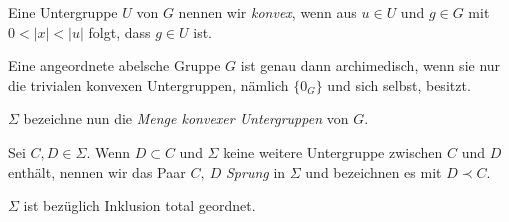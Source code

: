 \begin{defn}\label{konvexUGR} %
Eine Untergruppe $U$ von $G$ nennen wir \textit{konvex}, wenn aus $u \in U$ und $g \in G$ mit $0 < |x| < |u|$ folgt, dass $g \in U$ ist.\\
\end{defn}
%
%
%
%
%
\begin{satz}\label{archimedischNur TrivialeUGR}
Eine angeordnete abelsche Gruppe $G$ ist genau dann archimedisch, wenn sie nur die trivialen konvexen Untergruppen, nämlich $\lbrace 0_G\rbrace$ und sich selbst, besitzt.
\end{satz}
%
%
%
%
%
%
$\Sigma$ bezeichne nun die \textit{Menge konvexer Untergruppen} von $G$. 
\begin{defn}\label{Sprung} %
Sei $C, D \in \Sigma$. Wenn $D \subset C$ und $\Sigma$ keine weitere Untergruppe zwischen $C$ und $D$ enthält, nennen wir das Paar $C,~D$ \textit{Sprung} in $\Sigma$ und bezeichnen es mit $D \prec C$.
\end{defn}
%
% 
%
%
%
%
\begin{lemma}\label{untergruppeangeordnet}
$\Sigma$ ist bezüglich Inklusion total geordnet.
\end{lemma}
